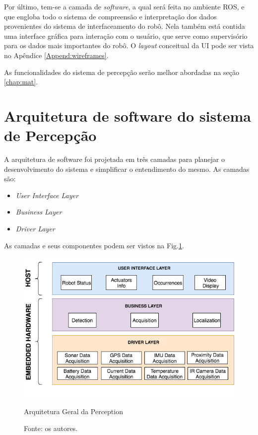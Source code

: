  
 Por último, tem-se a camada de \textit{software}, a qual será feita no ambiente ROS, e que engloba todo o sistema de compreensão e interpretação dos dados provenientes do sistema de interfaceamento do robô. Nela também está contida uma interface gráfica para interação com o usuário, que serve como supervisório para os dados mais importantes do robô. O \textit{layout} conceitual da UI pode ser vista no Apêndice \ref{Append:wireframes}. 
 
 As funcionalidades do sistema de percepção serão melhor abordadas na seção \ref{chap:mat}.
 

\section{Arquitetura de software do sistema de Percepção}
\label{ssec:arqsp}


A arquitetura de software foi projetada em três camadas para planejar o desenvolvimento do sistema e simplificar o entendimento do mesmo. As camadas são:

\begin{itemize}
	\item \textit{User Interface Layer}
	\item \textit{Business Layer}
	\item \textit{Driver Layer}
\end{itemize}
 
As camadas e seus componentes podem ser vistos na Fig.\ref{arqsoft}.

\begin{figure}[h]
	\centering
	\includegraphics[width=15cm]{Figures/ArquiteturadeSoftware.png}
	\caption{Arquitetura Geral da Perception}
	\caption*{Fonte: os autores.}
	\label{arqsoft}
\end{figure}

